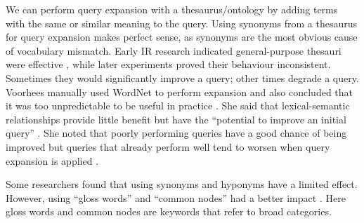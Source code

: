 We can perform query expansion with a thesaurus/ontology by adding terms with the same or similar meaning to the query. Using synonyms from a thesaurus for query expansion makes perfect sense, as synonyms are the most obvious cause of vocabulary mismatch. Early IR research indicated general-purpose thesauri were effective \cite{ASI:ASI4630360102}, while later experiments proved their behaviour inconsistent. Sometimes they would significantly improve a query; other times degrade a query. Voorhees manually used WordNet to perform expansion and also concluded that it was too unpredictable to be useful in practice \cite{Salton:1968:CEI:321439.321441}. She said that lexical-semantic relationships provide little benefit but have the ``potential to improve an initial query'' \cite{Voorhees:1994:QEU:188490.188508}. She noted that poorly performing queries have a good chance of being improved but queries that already perform well tend to worsen when query expansion is applied \cite{mandala1998use}.


Some researchers found that using synonyms and hyponyms have a limited effect. However, using ``gloss words'' and ``common nodes'' had a better impact \cite{navigli2003analysis}. Here gloss words and common nodes are keywords that refer to broad categories.









